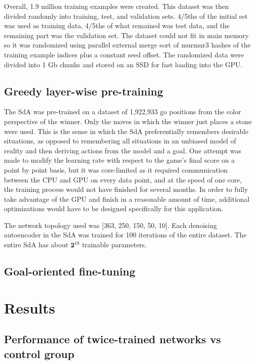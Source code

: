 \documentclass[12pt]{article}
\begin{document}
Overall, 1.9 million training examples were created. This dataset was then divided randomly into training, test, and validation sets. 4/5ths of the initial set was used as training data, 4/5ths of what remained was test data, and the remaining part was the validation set. The dataset could not fit in main memory so it was randomized using parallel external merge sort of murmur3 hashes of the training example indices plus a constant seed offset. The randomized data were divided into 1 Gb chunks and stored on an SSD for fast loading into the GPU.
	
	\subsection{Greedy layer-wise pre-training}

The SdA was pre-trained on a dataset of 1,922,933 go positions from the color perspective of the winner. Only the moves in which the winner just places a stone were used. This is the sense in which the SdA preferentially remembers desirable situations, as opposed to remembering all situations in an unbiased model of reality and then deriving actions from the model and a goal. One attempt was made to modify the learning rate with respect to the game's final score on a point by point basis, but it was core-limited as it required communication between the CPU and GPU on every data point, and at the speed of one core, the training process would not have finished for several months. In order to fully take advantage of the GPU and finish in a reasonable amount of time, additional optimizations would have to be designed specifically for this application.

The network topology used was [363, 250, 150, 50, 10]. Each denoising autoencoder in the SdA was trained for 100 iterations of the entire dataset. The entire SdA has about $\mathbf 2^{18}$ trainable parameters.
	
	\subsection{Goal-oriented fine-tuning}

	
\section{Results}

	\subsection{Performance of twice-trained networks vs control group}
\end{document}
